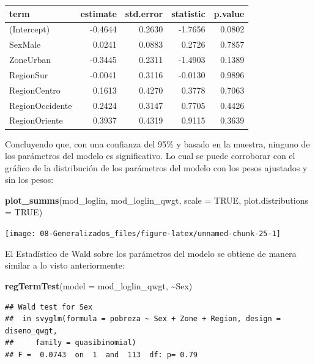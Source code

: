 \documentclass[
  spanish,
  12pt,
]{book}
\newenvironment{Shaded}{\begin{snugshade}}{\end{snugshade}}
\newcommand{\AttributeTok}[1]{\textcolor[rgb]{0.13,0.29,0.53}{#1}}
\newcommand{\ConstantTok}[1]{\textcolor[rgb]{0.56,0.35,0.01}{#1}}
\newcommand{\FunctionTok}[1]{\textcolor[rgb]{0.13,0.29,0.53}{\textbf{#1}}}
\newcommand{\NormalTok}[1]{#1}
\newcommand{\SpecialCharTok}[1]{\textcolor[rgb]{0.81,0.36,0.00}{\textbf{#1}}}
\begin{document}
\begin{tabular}{l|r|r|r|r}
\hline
term & estimate & std.error & statistic & p.value\\
\hline
(Intercept) & -0.4644 & 0.2630 & -1.7656 & 0.0802\\
\hline
SexMale & 0.0241 & 0.0883 & 0.2726 & 0.7857\\
\hline
ZoneUrban & -0.3445 & 0.2311 & -1.4903 & 0.1389\\
\hline
RegionSur & -0.0041 & 0.3116 & -0.0130 & 0.9896\\
\hline
RegionCentro & 0.1613 & 0.4270 & 0.3778 & 0.7063\\
\hline
RegionOccidente & 0.2424 & 0.3147 & 0.7705 & 0.4426\\
\hline
RegionOriente & 0.3937 & 0.4319 & 0.9115 & 0.3639\\
\hline
\end{tabular}

Concluyendo que, con una confianza del 95\% y basado en la muestra, ninguno de los parámetros del modelo es significativo. Lo cual se puede corroborar con el gráfico de la distribución de los parámetros del modelo con los pesos ajustados y sin los pesos:

\begin{Shaded}
\begin{Highlighting}[]
\FunctionTok{plot\_summs}\NormalTok{(mod\_loglin, mod\_loglin\_qwgt, }
             \AttributeTok{scale =} \ConstantTok{TRUE}\NormalTok{, }\AttributeTok{plot.distributions =} \ConstantTok{TRUE}\NormalTok{)}
\end{Highlighting}
\end{Shaded}

\texttt{[image: 08-Generalizados\_files/figure-latex/unnamed-chunk-25-1]}

El Estadístico de Wald sobre los parámetros del modelo se obtiene de manera similar a lo visto anteriormente:

\begin{Shaded}
\begin{Highlighting}[]
\FunctionTok{regTermTest}\NormalTok{(}\AttributeTok{model =}\NormalTok{ mod\_loglin\_qwgt, }\SpecialCharTok{\textasciitilde{}}\NormalTok{Sex)}
\end{Highlighting}
\end{Shaded}

\begin{verbatim}
## Wald test for Sex
##  in svyglm(formula = pobreza ~ Sex + Zone + Region, design = diseno_qwgt, 
##     family = quasibinomial)
## F =  0.0743  on  1  and  113  df: p= 0.79
\end{verbatim}
\end{document}

